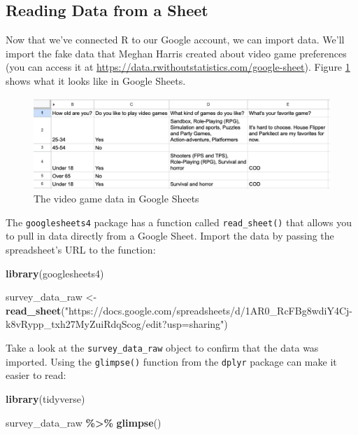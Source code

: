\documentclass[
]{book}
\newenvironment{Shaded}{\begin{snugshade}}{\end{snugshade}}
\newcommand{\FunctionTok}[1]{\textcolor[rgb]{0.13,0.29,0.53}{\textbf{#1}}}
\newcommand{\NormalTok}[1]{#1}
\newcommand{\OtherTok}[1]{\textcolor[rgb]{0.56,0.35,0.01}{#1}}
\newcommand{\SpecialCharTok}[1]{\textcolor[rgb]{0.81,0.36,0.00}{\textbf{#1}}}
\newcommand{\StringTok}[1]{\textcolor[rgb]{0.31,0.60,0.02}{#1}}
\begin{document}
\hypertarget{reading-data-from-a-sheet}{%
\subsection*{Reading Data from a Sheet}\label{reading-data-from-a-sheet}}

Now that we've connected R to our Google account, we can import data. We'll import the fake data that Meghan Harris created about video game preferences (you can access it at \url{https://data.rwithoutstatistics.com/google-sheet}). Figure \ref{fig:video-game-survey-data} shows what it looks like in Google Sheets.

\begin{figure}
\includegraphics[width=1\linewidth]{assets/video-game-survey-data} \caption{The video game data in Google Sheets}\label{fig:video-game-survey-data}
\end{figure}

The \texttt{googlesheets4} package has a function called \texttt{read\_sheet()} that allows you to pull in data directly from a Google Sheet. Import the data by passing the spreadsheet's URL to the function:

\begin{Shaded}
\begin{Highlighting}[]
\FunctionTok{library}\NormalTok{(googlesheets4)}

\NormalTok{survey\_data\_raw }\OtherTok{\textless{}{-}} \FunctionTok{read\_sheet}\NormalTok{(}\StringTok{"https://docs.google.com/spreadsheets/d/1AR0\_RcFBg8wdiY4Cj{-}k8vRypp\_txh27MyZuiRdqScog/edit?usp=sharing"}\NormalTok{)}
\end{Highlighting}
\end{Shaded}

Take a look at the \texttt{survey\_data\_raw} object to confirm that the data was imported. Using the \texttt{glimpse()} function from the \texttt{dplyr} package can make it easier to read:

\begin{Shaded}
\begin{Highlighting}[]
\FunctionTok{library}\NormalTok{(tidyverse)}

\NormalTok{survey\_data\_raw }\SpecialCharTok{\%\textgreater{}\%} 
  \FunctionTok{glimpse}\NormalTok{()}
\end{Highlighting}
\end{Shaded}
\end{document}

